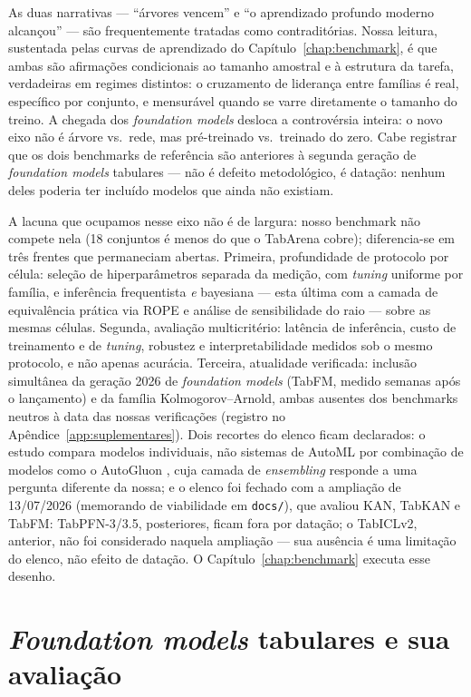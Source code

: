 As duas narrativas
--- ``árvores vencem'' \citep{grinsztajn2022} e ``o aprendizado profundo
moderno alcançou'' \citep{realmlp2024,tabm2025} --- são frequentemente
tratadas como contraditórias. Nossa leitura, sustentada pelas curvas de
aprendizado do Capítulo~\ref{chap:benchmark}, é que ambas são afirmações
condicionais ao tamanho amostral e à estrutura da tarefa, verdadeiras em
regimes distintos: o cruzamento de liderança entre famílias é real,
específico por conjunto, e mensurável quando se varre diretamente o tamanho
do treino. A chegada dos \emph{foundation models} desloca a controvérsia
inteira: o novo eixo não é árvore vs.\ rede, mas pré-treinado vs.\ treinado
do zero. Cabe registrar que os dois benchmarks de referência são anteriores
à segunda geração de \emph{foundation models} tabulares --- não é defeito
metodológico, é datação: nenhum deles poderia ter incluído modelos que
ainda não existiam.

A lacuna que ocupamos nesse eixo não é de largura: nosso benchmark não
compete nela (18 conjuntos é
menos do que o TabArena cobre); diferencia-se em três frentes que
permaneciam abertas. Primeira, profundidade de protocolo por célula:
seleção de hiperparâmetros separada da medição, com \emph{tuning}
uniforme por família, e
inferência frequentista \emph{e} bayesiana --- esta última com a camada de
equivalência prática via ROPE \citep{benavoli2017} e análise de
sensibilidade do raio --- sobre as mesmas células. Segunda, avaliação
multicritério: latência de inferência, custo de treinamento e de
\emph{tuning}, robustez e interpretabilidade medidos sob o mesmo protocolo,
e não apenas acurácia. Terceira, atualidade verificada: inclusão simultânea
da geração 2026 de \emph{foundation models} (TabFM, medido semanas após o
lançamento) e da família Kolmogorov--Arnold, ambas ausentes dos benchmarks
neutros à data das nossas verificações (registro no
Apêndice~\ref{app:suplementares}). Dois recortes
do elenco ficam declarados: o estudo compara modelos individuais, não
sistemas de AutoML por combinação de modelos como o AutoGluon
\citep{erickson2020}, cuja camada de \emph{ensembling} responde a uma
pergunta diferente da nossa; e o elenco foi fechado com a ampliação
de 13/07/2026 (memorando de viabilidade em \texttt{docs/}), que
avaliou KAN, TabKAN e TabFM: TabPFN-3/3.5, posteriores, ficam fora
por datação; o TabICLv2, anterior, não foi considerado naquela
ampliação --- sua ausência é uma limitação do elenco, não efeito de
datação. O
Capítulo~\ref{chap:benchmark} executa esse desenho.

\section{\emph{Foundation models} tabulares e sua avaliação}
\label{sec:rel-tfm}

